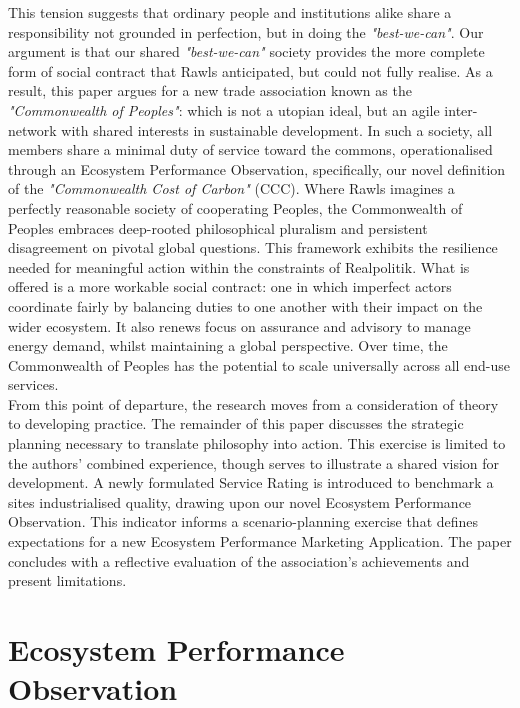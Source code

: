 This tension suggests that ordinary people and institutions alike share a responsibility not grounded in perfection, but in doing the \emph{"best-we-can"}.
Our argument is that our shared \emph{"best-we-can"} society provides the more complete form of social contract that Rawls anticipated, but could not fully realise.
As a result, this paper argues for a new trade association known as the \emph{"Commonwealth of Peoples"}: which is not a utopian ideal, but an agile inter-network with shared interests in sustainable development.
In such a society, all members share a minimal duty of service toward the commons, operationalised through an Ecosystem Performance Observation, specifically, our novel definition of the \emph{"Commonwealth Cost of Carbon"} (CCC).
Where Rawls imagines a perfectly reasonable society of cooperating Peoples, the Commonwealth of Peoples embraces deep-rooted philosophical pluralism and persistent disagreement on pivotal global questions.
This framework exhibits the resilience needed for meaningful action within the constraints of Realpolitik.
What is offered is a more workable social contract: one in which imperfect actors coordinate fairly by balancing duties to one another with their impact on the wider ecosystem.
It also renews focus on assurance and advisory to manage energy demand, whilst maintaining a global perspective.
Over time, the Commonwealth of Peoples has the potential to scale universally across all end-use services.\\

From this point of departure, the research moves from a consideration of theory to developing practice.
The remainder of this paper discusses the strategic planning necessary to translate philosophy into action.
This exercise is limited to the authors’ combined experience, though serves to illustrate a shared vision for development.
A newly formulated Service Rating is introduced to benchmark a sites industrialised quality, drawing upon our novel Ecosystem Performance Observation.
This indicator informs a scenario-planning exercise that defines expectations for a new Ecosystem Performance Marketing Application.
The paper concludes with a reflective evaluation of the association's achievements and present limitations.\\

\section{Ecosystem Performance Observation}

